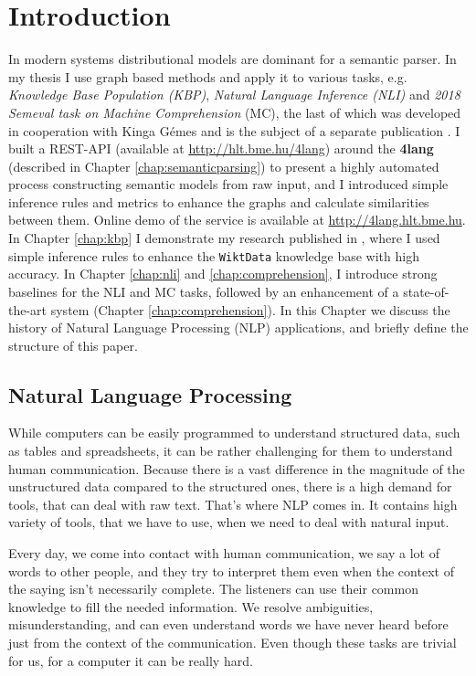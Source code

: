 \chapter{Introduction}
\label{chap:Introdu}
In modern systems distributional models are dominant for a semantic parser. In my thesis I use graph based methods and 
apply it to various tasks, e.g. \textit{Knowledge Base Population (KBP)}, \textit{Natural Language Inference (NLI)} and \textit{2018 Semeval task on Machine Comprehension} (MC), the last of which was developed in cooperation with Kinga G\'emes and is the subject of a separate publication \cite{Kovacs:2018b}.
I built a REST-API (available at \url{http://hlt.bme.hu/4lang}) 
around the \textbf{4lang}\cite{Recski:2016} (described in Chapter \ref{chap:semanticparsing}) 
to present a highly automated process constructing semantic models from raw input, and I introduced simple inference rules and metrics to enhance the graphs and calculate similarities between them.
Online demo of the service is available at \url{http://4lang.hlt.bme.hu}. 
In Chapter \ref{chap:kbp} I demonstrate my research published in \cite{Kovacs:2018}, where I used simple inference rules to enhance the \texttt{WiktData} knowledge base with high accuracy.  
In Chapter \ref{chap:nli} and \ref{chap:comprehension}, I introduce strong baselines for the NLI and MC tasks, 
followed by an enhancement of a state-of-the-art system \cite{Wang:2018} (Chapter \ref{chap:comprehension}). 
In this Chapter we discuss the history of Natural Language Processing (NLP) applications, 
and briefly define the structure of this paper.
\section{Natural Language Processing}
While computers can be easily programmed to understand structured data, such as tables and spreadsheets, it can be rather challenging for them
to understand human communication. Because there is a vast difference in the magnitude of the unstructured data compared to the structured ones, there is a high demand
for tools, that can deal with raw text. That's where NLP comes in. It contains high variety of tools, that we have to use, when we need to deal with natural input.

Every day, we come into contact with human communication, we say a lot of words to other people, and they try to interpret them even when the context of the saying 
isn't necessarily complete. The listeners can use their common knowledge to fill the needed information. We resolve ambiguities, misunderstanding, and can even understand words 
we have never heard before just from the context of the communication.
Even though these tasks are trivial for us, for a computer it can be really hard.

